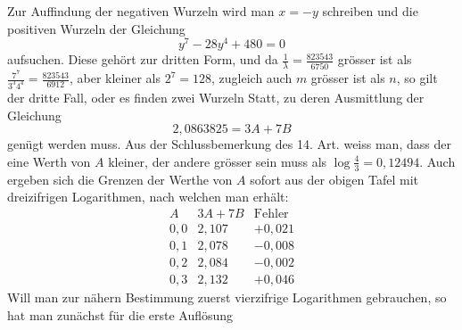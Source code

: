 Zur Auffindung der negativen Wurzeln wird man $x=-y$ schreiben und
die positiven Wurzeln der Gleichung
\[
y^{7}-28y^{4}+480=0
\]
aufsuchen. Diese gehört zur dritten Form, und da $\frac{1}{\lambda}=\frac{823543}{6750}$ grösser ist als
$\frac{7^{7}}{3^{3}4^{4}}=\frac{823543}{6912}$, aber kleiner als $2^{7}=128$, zugleich auch $m$ grösser ist als $n$, so
gilt der dritte Fall, oder es finden zwei Wurzeln Statt, zu deren Ausmittlung
der Gleichung
\[
2{,}0863825=3A+7B
\]
genügt werden muss. Aus der Schlussbemerkung des 14. Art. weiss man, dass
der eine Werth von $A$ kleiner, der andere grösser sein muss als $\log\frac{4}{3}=0{,}12494$.
Auch ergeben sich die Grenzen der Werthe von $A$ sofort aus der obigen Tafel
mit dreizifrigen Logarithmen, nach welchen man erhält:
\[
\begin{array}{c|c|r}
A&3A+7B&\mbox{Fehler}\\ \hline
0{,}0&2{,}107&+0{,}021\\
0{,}1&2{,}078&-0{,}008\\
0{,}2&2{,}084&-0{,}002\\
0{,}3&2{,}132&+0{,}046
\end{array}
\]
Will man zur nähern Bestimmung zuerst vierzifrige Logarithmen gebrauchen, so
hat man zunächst für die erste Auflösung
